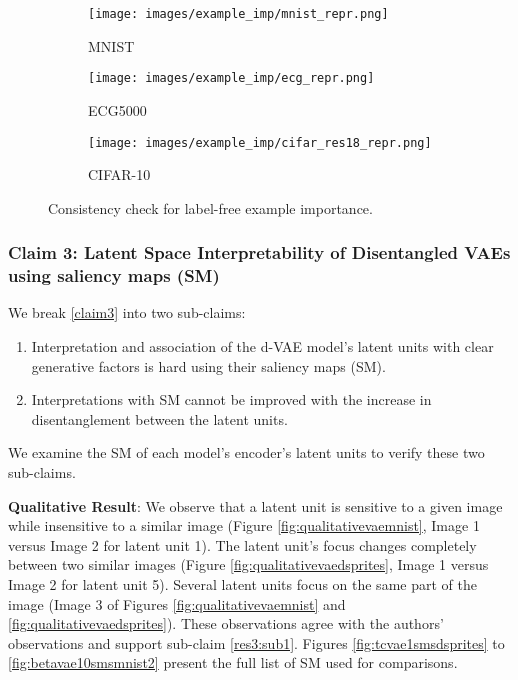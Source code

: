 \begin{figure*}[h]
\centering
\begin{subfigure}[b]{0.24\linewidth}
\texttt{[image: images/example\_imp/mnist\_repr.png]}
\caption{MNIST}\label{fig:mnistce}
\end{subfigure}
\begin{subfigure}[b]{0.24\linewidth}
\texttt{[image: images/example\_imp/ecg\_repr.png]} 
\caption{ECG5000}\label{fig:ecg5000_ce}
\end{subfigure}
\begin{subfigure}[b]{0.24\linewidth}
\texttt{[image: images/example\_imp/cifar\_res18\_repr.png]} 
\caption{CIFAR-10}\label{fig:cifar10_ce}
\end{subfigure}
\caption{Consistency check for label-free example importance.}\label{fig:labelfreece}
\end{figure*}

\subsubsection{Claim 3: Latent Space Interpretability of Disentangled VAEs using saliency maps (SM)}\label{section:result3}
We break \ref{claim3} into two sub-claims: 

\begin{enumerate}[labelindent=\parindent,leftmargin=*, topsep=0pt]
    \itemsep-0.2em
    \item\label{res3:sub1} Interpretation and association of the d-VAE model's latent units with clear generative factors is hard using their saliency maps (SM).
    \item \label{res3:sub2}  Interpretations with SM cannot be improved with the increase in disentanglement between the latent units. 
\end{enumerate}

 We examine the SM of each model's encoder's latent units to verify these two sub-claims.

\textbf{Qualitative Result}: We observe that a latent unit is sensitive to a given image while insensitive to a similar image (Figure \ref{fig:qualitativevaemnist}, Image 1 versus Image 2 for latent unit 1). The latent unit's focus changes completely between two similar images (Figure \ref{fig:qualitativevaedsprites}, Image 1 versus Image 2 for latent unit 5). Several latent units focus on the same part of the image (Image 3 of Figures \ref{fig:qualitativevaemnist} and \ref{fig:qualitativevaedsprites}). These observations agree with the authors' observations and support sub-claim \ref{res3:sub1}. Figures \ref{fig:tcvae1smsdsprites} to \ref{fig:betavae10smsmnist2} present the full list of SM used for comparisons. 

